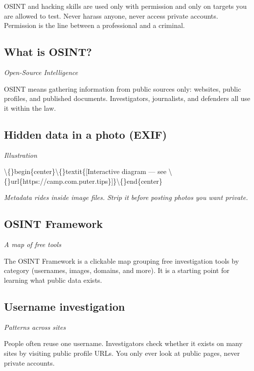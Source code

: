\documentclass[12pt,openany]{book}
\begin{document}
OSINT and hacking skills are used only with permission and only on targets you are allowed to test. Never harass anyone, never access private accounts. Permission is the line between a professional and a criminal.

\medskip

\subsection*{What is OSINT?}
{\small\itshape\color{gray}Open-Source Intelligence}


OSINT means gathering information from public sources only: websites, public profiles, and published documents. Investigators, journalists, and defenders all use it within the law.

\medskip

\subsection*{Hidden data in a photo (EXIF)}
{\small\itshape\color{gray}Illustration}

\textbackslash\{\}begin\{center\}\textbackslash\{\}textit\{[Interactive diagram --- see \textbackslash\{\}url\{https://camp.com.puter.tips\}]\}\textbackslash\{\}end\{center\}

{\small\itshape\color{gray}Metadata rides inside image files. Strip it before posting photos you want private.}

\medskip

\subsection*{OSINT Framework}
{\small\itshape\color{gray}A map of free tools}


The OSINT Framework is a clickable map grouping free investigation tools by category (usernames, images, domains, and more). It is a starting point for learning what public data exists.

\medskip

\subsection*{Username investigation}
{\small\itshape\color{gray}Patterns across sites}


People often reuse one username. Investigators check whether it exists on many sites by visiting public profile URLs. You only ever look at public pages, never private accounts.
\end{document}
